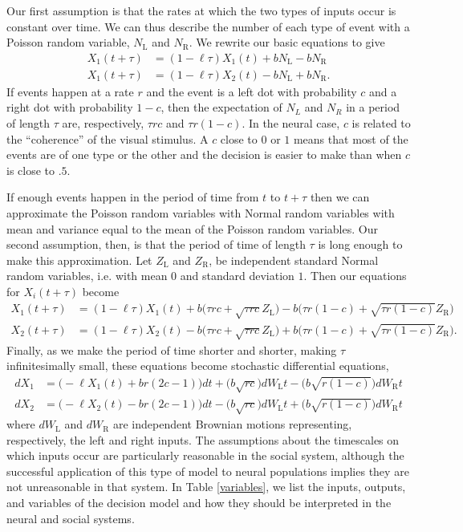 \documentclass{article}
\begin{document}
Our first assumption is that the rates at which the two types of inputs occur is constant over time.  We can thus describe the number of each type of event with a Poisson random variable, $N_\text{L}$ and $N_\text{R}$.  We rewrite our basic equations to give 
\begin{align*}
X_1(t+\tau)&=(1-\ell\tau)X_1(t)+bN_\text{L}-bN_\text{R}
\\ X_1(t+\tau)&=(1-\ell\tau)X_2(t)-bN_\text{L}+bN_\text{R}.
\end{align*}
If events happen at a rate $r$ and the event is a left dot with probability $c$ and a right dot with probability $1-c$, then the expectation of $N_L$ and $N_R$ in a period of length $\tau$ are, respectively, $\tau r c$ and $\tau r(1-c)$. In the neural case, $c$ is related to the ``coherence'' of the visual stimulus.  A $c$ close to $0$ or $1$ means that most of the events are of one type or the other and the decision is easier to make than when $c$ is close to $.5$.

If enough events happen in the period of time from $t$ to $t+\tau$ then we can approximate the Poisson random variables with Normal random variables with mean and variance equal to the mean of the Poisson random variables.  Our second assumption, then, is that the period of time of length $\tau$ is long enough to make this approximation. Let $Z_\text{L}$ and $Z_\text{R}$, be independent standard Normal random variables, i.e. with mean $0$ and standard deviation $1$.  Then our equations for $X_i(t+\tau)$ become
\begin{align*}
X_1(t+\tau)&=(1-\ell\tau)X_1(t)+b\bigg(\tau rc+\sqrt{\tau rc}Z_{\text{L}}\bigg)-b\bigg(\tau r(1-c)+\sqrt{\tau r(1-c)}Z_{\text{R}}\bigg)
\\X_2(t+\tau)&=(1-\ell\tau)X_2(t)-b\bigg(\tau rc+\sqrt{\tau rc}Z_{\text{L}}\bigg)+b\bigg(\tau r(1-c)+\sqrt{\tau r(1-c)}Z_{\text{R}}\bigg).
\end{align*}
Finally, as we make the period of time shorter and shorter, making $\tau$ infinitesimally small, these equations become stochastic differential equations,
\begin{equation}
\begin{array}{ll}
dX_1&=\bigg(-\ell X_1(t)+br(2c-1)\bigg)dt+\bigg(b\sqrt{rc}\bigg)dW_\text{L}t-\bigg(b\sqrt{r(1-c)}\bigg)dW_\text{R}t
\\dX_2&=\bigg(-\ell X_2(t)-br(2c-1)\bigg)dt-\bigg(b\sqrt{rc}\bigg)dW_\text{L}t+\bigg(b\sqrt{r(1-c)}\bigg)dW_\text{R}t
\end{array}
\end{equation}
where $dW_{\text{L}}$ and $dW_{\text{R}}$ are independent Brownian motions representing, respectively, the left and right inputs.  The assumptions about the timescales on which inputs occur are particularly reasonable in the social system, although the successful application of this type of model to neural populations implies they are not unreasonable in that system.  In Table \ref{variables}, we list the inputs, outputs, and variables of the decision model and how they should be interpreted in the neural and social systems.
\end{document}
